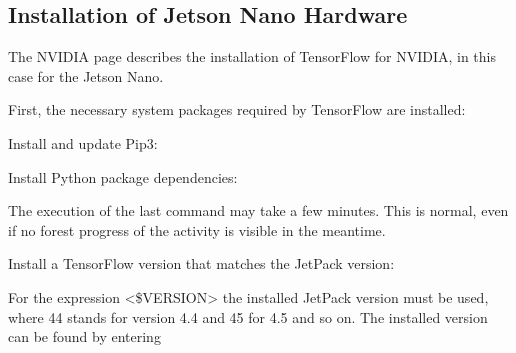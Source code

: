 \subsection{Installation of Jetson Nano Hardware}

The NVIDIA page describes the installation of TensorFlow for NVIDIA, in this case for the Jetson Nano.\cite{NVIDIA.27.10.2020}

First, the necessary system packages required by TensorFlow are installed:

\medskip





\medskip

Install and update Pip3:


\medskip

Install Python package dependencies:

\medskip




\medskip

The execution of the last command may take a few minutes. This is normal, even if no forest progress of the activity is visible in the meantime.

\medskip

Install a TensorFlow version that matches the JetPack version:

\medskip




\medskip

For the expression <\$VERSION> the installed JetPack version must be used, where 44 stands for version 4.4 and 45 for 4.5 and so on. The installed version can be found by entering

